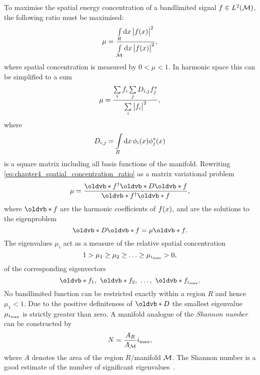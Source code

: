 To maximise the spatial energy concentration of a bandlimited signal \(f \in L^{2}(\mathcal{M})\), the following ratio must be maximised:
%
\begin{equation}
	\mu
	= \frac{\int\limits_{R} \dd{x} \big\lvert f(x)\big\rvert^{2}}{\int\limits_{\mathcal{M}} \dd{x} \big\lvert f(x)\big\rvert^{2}},
\end{equation}
%
where spatial concentration is measured by \(0 < \mu < 1\).
In harmonic space this can be simplified to a sum
%
\begin{equation}\label{eq:chapter4_spatial_concentration_ratio}
	\mu
	= \frac{\sum\limits_{i} f_{i} \sum\limits_{j} D_{i,j} f_{j}^{\ast}}{\sum\limits_{i} \big\lvert f_{i}\big\rvert^{2}},
\end{equation}
%
where
%
\begin{equation}
	D_{i,j}
	= \int\limits_{R} \dd{x} \phi_{i}(x) \phi_{j}^{\ast}(x)
\end{equation}
%
is a square matrix including all basis functions of the manifold.
Rewriting \cref{eq:chapter4_spatial_concentration_ratio} as a matrix variational problem
%
\begin{equation}
	\mu
	= \frac{\hermitian{\vb{f}} \vb{D} \vb{f}}{\hermitian{\vb{f}} \vb{f}},
\end{equation}
%
where \(\vb{f}\) are the harmonic coefficients of \(f(x)\), and are the solutions to the eigenproblem
%
\begin{equation}\label{eq:chapter4_eigenproblem}
	\vb{D}\vb{f}
	= \mu \vb{f}.
\end{equation}
%
The eigenvalues \(\mu_{i}\) act as a measure of the relative spatial concentration
%
\begin{equation}
	1 > \mu_{1} \geq \mu_{2} \geq \ldots \geq \mu_{\imax} > 0, %
\end{equation}
%
of the corresponding eigenvectors
%
\begin{equation}
	\vb{f}_{1},\ \vb{f}_{2},\ \ldots,\ \vb{f}_{\imax}.
\end{equation}
%
No bandlimited function can be restricted exactly within a region \(R\) and hence \(\mu_{1}<1\).
Due to the positive definiteness of \(\vb{D}\) the smallest eigenvalue \(\mu_{i_{\text{max}}}\) is strictly greater than zero.
A manifold analogue of the \emph{Shannon number} can be constructed by
%
\begin{equation}\label{eq:chapter4_shannon}
	N
	= \frac{A_{R}}{A_{\mathcal{M}}} i_{\text{max}},
\end{equation}
%
where \(A\) denotes the area of the region \(R\)/manifold \(\mathcal{M}{}\).
The Shannon number is a good estimate of the number of significant eigenvalues~\cite{Percival1993}.


